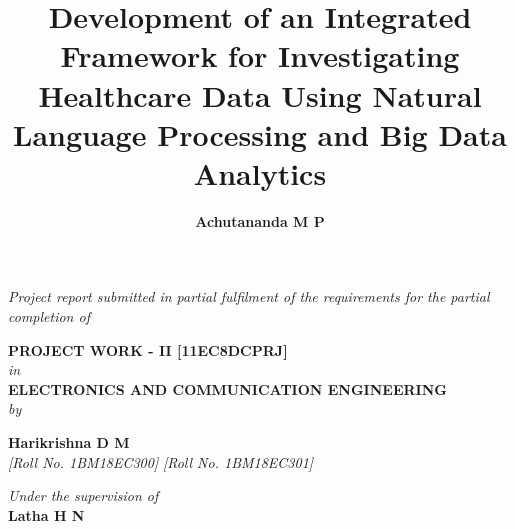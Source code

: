 \title{\fontsize{16pt}{19.2pt}\selectfont\bf{Development of an Integrated Framework for Investigating Healthcare Data Using Natural Language Processing and Big Data Analytics}}
\date{}

\maketitle
\thispagestyle{empty}

\begin{center}
\vspace*{-8mm}
\textit{Project report submitted in partial fulfilment of the requirements for the partial completion of}

\vspace*{6mm}

{\fontsize{14pt}{16.8pt}\selectfont\textbf{PROJECT WORK - II [11EC8DCPRJ]}} \\ \vspace*{3mm}
{\fontsize{14pt}{16.8pt}\selectfont\textit{in}} \\
\vspace*{3mm}
%
{\fontsize{14pt}{16.8pt}\selectfont\textbf{ELECTRONICS AND COMMUNICATION ENGINEERING}} \\

\vspace*{2mm}
{\fontsize{14pt}{16.8pt}\selectfont\textit{by}} \\
\vspace*{3mm}

\author{\fontsize{14pt}{16.8pt}\selectfont\textbf{Achutananda M P}}  \hspace*{12mm} {\fontsize{14pt}{16.8pt}\selectfont\textbf{Harikrishna D M}}\\
\vspace*{2mm}
{\fontsize{12pt}{14.4pt}\selectfont\textit{[Roll No. 1BM18EC300]} \hspace*{12mm} \selectfont\textit{[Roll No. 1BM18EC301]} } \\



\vspace*{3mm}

\vspace*{4mm}\fontsize{14pt}{16.8pt}\selectfont\textit{Under the supervision of} \\
\vspace*{2mm}\fontsize{14pt}{16.8pt}\selectfont\textbf{Latha H N} \\
\vspace*{8mm}


\end{center}
